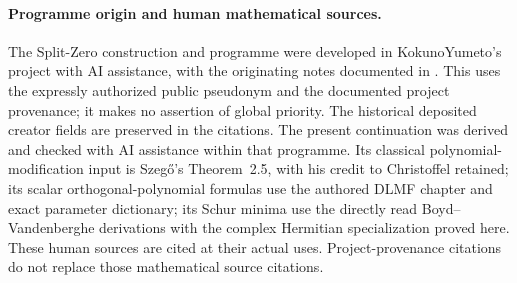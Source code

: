 \paragraph{Programme origin and human mathematical sources.}
The Split-Zero construction and programme were developed in
KokunoYumeto's project with AI assistance, with the originating
notes documented in \cite{human:globalization2026,
human:splitzero2026}. This uses the expressly authorized
public pseudonym and the documented project provenance; it makes
no assertion of global priority. The historical deposited creator
fields are preserved in the citations.
The present continuation was derived and checked with AI assistance
within that programme. Its classical polynomial-modification input
is Szeg\H{o}'s Theorem~2.5, with his credit to Christoffel retained;
its scalar orthogonal-polynomial formulas use the authored DLMF
chapter and exact parameter dictionary; its Schur minima use the
directly read Boyd--Vandenberghe derivations with the complex
Hermitian specialization proved here. These human sources are cited
at their actual uses. Project-provenance citations do not replace
those mathematical source citations.
